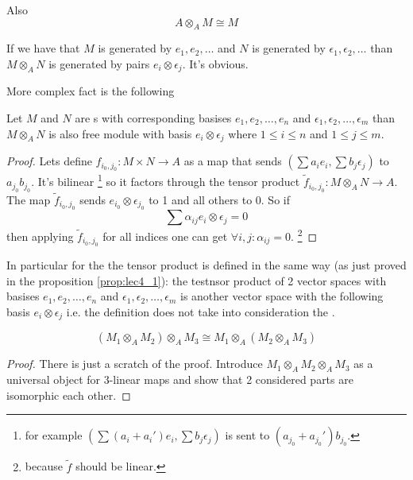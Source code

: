 Also
\[
A \otimes_A M \cong M
\]

If we have that $M$ is generated by $e_1, e_2, \dots$ and
$N$ is generated by $\epsilon_1, \epsilon_2, \dots$ than
$M \otimes_A N$ is generated by pairs $e_i \otimes \epsilon_j$. It's
obvious.

More complex fact is the following
\begin{proposition}
  Let $M$ and $N$ are s
  with corresponding basises $e_1, e_2, \dots, e_n$ and
  $\epsilon_1, \epsilon_2, \dots, \epsilon_m$ than
  $M \otimes_A N$ is also free module with basis $e_i \otimes
  \epsilon_j$ where $1 \le i \le n$ and
  $1 \le j \le m$.
  \begin{proof}
    Lets define
    $f_{i_0,j_0}: M \times N \to A$ as a map that sends
    $\left(\sum a_i e_i, \sum b_j \epsilon_j\right)$ to
    $a_{j_0} b_{j_0}$. It's bilinear
    \footnote{
      for example
      $\left(\sum (a_i + a_i') e_i, \sum b_j \epsilon_j\right)$ is
      sent to  $(a_{j_0} + a_{j_0}') b_{j_0}$.
    }
    so it factors through the tensor product
    $\tilde{f}_{i_0, j_0} : M \otimes_A N \to A$. The map
    $\tilde{f}_{i_0, j_0}$ sends $e_{i_0} \otimes \epsilon_{j_0}$ to 1
    and all others to 0. So if
    \[
    \sum \alpha_{ij} e_i \otimes \epsilon_j = 0
    \]
    then applying $\tilde{f}_{i_0, j_0}$ for all indices one can get
    $\forall i,j: \alpha_{ij} = 0$.
    \footnote{
      because $\tilde{f}$ should be linear.
    }
  \end{proof}
  \label{prop:lec4_1}
\end{proposition}

In particular for the  the tensor product is
defined in the same way (as just proved in the proposition
\ref{prop:lec4_1}): the testnsor product of 2 vector spaces with
basises $e_1, e_2, \dots, e_n$ and
$\epsilon_1, \epsilon_2, \dots, \epsilon_m$ is another vector space
with the following basis $e_i \otimes \epsilon_j$ i.e. the definition
does not take into consideration the .

\begin{proposition}[Associative]
  \[
  \left(M_1 \otimes_A M_2\right) \otimes_A M_3
  \cong
  M_1 \otimes_A \left(M_2 \otimes_A M_3\right)
  \]
  \begin{proof}
    There is just a scratch of the proof.
    Introduce
    $M_1 \otimes_A M_2 \otimes_A M_3$
    as a universal object for 3-linear maps and show that 2 considered
    parts are isomorphic each other.
  \end{proof}
  \label{prop:lec4_Associative}
\end{proposition}

